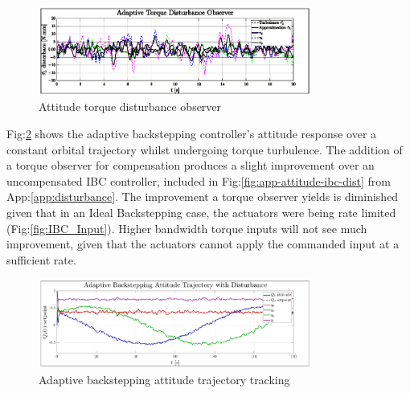 \begin{figure}[htbp]
\vspace{-10pt}
\centering
\includegraphics[width=0.8\textwidth]{graphs/torque-observer}
\vspace{-10pt}
\caption{Attitude torque disturbance observer}
\vspace{-18pt}
\label{fig:torque-observer}
\end{figure}
\par
Fig:\ref{fig:ABC_trajectory} shows the adaptive backstepping controller's attitude response over a constant orbital trajectory whilst undergoing torque turbulence. The addition of a torque observer for compensation produces a slight improvement over an uncompensated IBC controller, included in Fig:\ref{fig:app-attitude-ibc-dist} from App:\ref{app:disturbance}. The improvement a torque observer yields is diminished given that in an Ideal Backstepping case, the actuators were being rate limited (Fig:\ref{fig:IBC_Input}). Higher bandwidth torque inputs will not see much improvement, given that the actuators cannot apply the commanded input at a sufficient rate.
\begin{figure}[hbtp]
\vspace{-6pt}
\centering
\includegraphics[width=0.8\textwidth]{graphs/ABC_trajectory}
\vspace{-10pt}
\caption{Adaptive backstepping attitude trajectory tracking}
\label{fig:ABC_trajectory}
\vspace{-16pt}
\end{figure}

